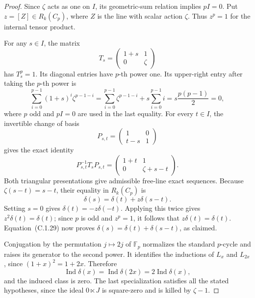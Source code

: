 \begin{proof}
Since $\zeta$ acts as one on $I$, its geometric-sum relation
implies $pI=0$. Put $z=[Z]\in R_k(C_p)$, where $Z$ is the line
with scalar action $\zeta$. Thus $z^p=1$ for the internal tensor
product.

For any $s\in I$, the matrix
\[
 T_s=\begin{pmatrix}1+s&1\\0&\zeta\end{pmatrix}
\]
has $T_s^p=1$. Its diagonal entries have $p$-th power one. Its
upper-right entry after taking the $p$-th power is
\[
 \sum_{i=0}^{p-1}(1+s)^i\zeta^{p-1-i}
 =\sum_{i=0}^{p-1}\zeta^{p-1-i}
   +s\sum_{i=0}^{p-1}i
 =s\frac{p(p-1)}2=0,
\]
where $p$ odd and $pI=0$ are used in the last equality.
For every $t\in I$, the invertible change of basis
\[
 P_{s,t}=\begin{pmatrix}1&0\\t-s&1\end{pmatrix}
\]
gives the exact identity
\[
 P_{s,t}^{-1}T_sP_{s,t}
   =\begin{pmatrix}1+t&1\\0&\zeta+s-t\end{pmatrix}.
\]
Both triangular presentations give admissible free-line exact
sequences. Because $\zeta(s-t)=s-t$, their equality in $R_k(C_p)$
is
\[
 \delta(s)=\delta(t)+z\delta(s-t).             \tag{C.1.29}
\]
Setting $s=0$ gives $\delta(t)=-z\delta(-t)$.
Applying this twice gives $z^2\delta(t)=\delta(t)$; since $p$
is odd and $z^p=1$, it follows that $z\delta(t)=\delta(t)$.
Equation~\textup{(C.1.29)} now proves
$\delta(s)=\delta(t)+\delta(s-t)$, as claimed.

Conjugation by the permutation $j\mapsto2j$ of $\mathbb F_p$
normalizes the standard $p$-cycle and raises its generator to the
second power. It identifies the inductions of $L_x$ and $L_{2x}$,
since $(1+x)^2=1+2x$. Therefore
\[
 \operatorname{Ind}\delta(x)=\operatorname{Ind}\delta(2x)
   =2\operatorname{Ind}\delta(x),
\]
and the induced class is zero. The last specialization satisfies
all the stated hypotheses, since the ideal $0\ltimes J$ is
square-zero and is killed by $\zeta-1$.
\end{proof}

